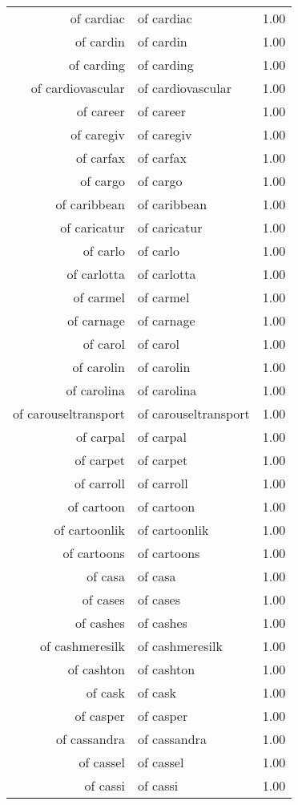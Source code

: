 \begin{table}[ht]
\begin{tabular}{rlr}
  of cardiac & of cardiac & 1.00 \\ 
  of cardin & of cardin & 1.00 \\ 
  of carding & of carding & 1.00 \\ 
  of cardiovascular & of cardiovascular & 1.00 \\ 
  of career & of career & 1.00 \\ 
  of caregiv & of caregiv & 1.00 \\ 
  of carfax & of carfax & 1.00 \\ 
  of cargo & of cargo & 1.00 \\ 
  of caribbean & of caribbean & 1.00 \\ 
  of caricatur & of caricatur & 1.00 \\ 
  of carlo & of carlo & 1.00 \\ 
  of carlotta & of carlotta & 1.00 \\ 
  of carmel & of carmel & 1.00 \\ 
  of carnage & of carnage & 1.00 \\ 
  of carol & of carol & 1.00 \\ 
  of carolin & of carolin & 1.00 \\ 
  of carolina & of carolina & 1.00 \\ 
  of carouseltransport & of carouseltransport & 1.00 \\ 
  of carpal & of carpal & 1.00 \\ 
  of carpet & of carpet & 1.00 \\ 
  of carroll & of carroll & 1.00 \\ 
  of cartoon & of cartoon & 1.00 \\ 
  of cartoonlik & of cartoonlik & 1.00 \\ 
  of cartoons & of cartoons & 1.00 \\ 
  of casa & of casa & 1.00 \\ 
  of cases & of cases & 1.00 \\ 
  of cashes & of cashes & 1.00 \\ 
  of cashmeresilk & of cashmeresilk & 1.00 \\ 
  of cashton & of cashton & 1.00 \\ 
  of cask & of cask & 1.00 \\ 
  of casper & of casper & 1.00 \\ 
  of cassandra & of cassandra & 1.00 \\ 
  of cassel & of cassel & 1.00 \\ 
  of cassi & of cassi & 1.00 \\ 

\end{tabular}
\end{table}
